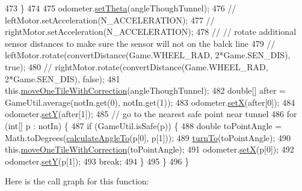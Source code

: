 \begin{DoxyCode}
473     \}
474 
475     odometer.\hyperlink{classca_1_1mcgill_1_1ecse211_1_1odometer_1_1_odometer_data_a419b8f07c2c5374411c8e62298e9a402}{setTheta}(angleThoughTunnel);
476     \textcolor{comment}{// leftMotor.setAcceleration(N\_ACCELERATION);}
477     \textcolor{comment}{// rightMotor.setAcceleration(N\_ACCELERATION);}
478     \textcolor{comment}{// // rotate additional sensor distances to make sure the sensor will not on the balck line}
479     \textcolor{comment}{// leftMotor.rotate(convertDistance(Game.WHEEL\_RAD, 2*Game.SEN\_DIS), true);}
480     \textcolor{comment}{// rightMotor.rotate(convertDistance(Game.WHEEL\_RAD, 2*Game.SEN\_DIS), false);}
481     this.\hyperlink{classca_1_1mcgill_1_1ecse211_1_1project_1_1_navigation_afbe677941e2bd44e35452e1eff508ae9}{moveOneTileWithCorrection}(angleThoughTunnel);
482     \textcolor{keywordtype}{double}[] after = GameUtil.average(notIn.get(0), notIn.get(1));
483     odometer.\hyperlink{classca_1_1mcgill_1_1ecse211_1_1odometer_1_1_odometer_data_a2911d7215e47f3064defe016b46bfeef}{setX}(after[0]);
484     odometer.\hyperlink{classca_1_1mcgill_1_1ecse211_1_1odometer_1_1_odometer_data_a82986438cd462e66520bc62bb4bd2b75}{setY}(after[1]);
485     \textcolor{comment}{// go to the nearest safe point near tunnel}
486     \textcolor{keywordflow}{for} (\textcolor{keywordtype}{int}[] p : notIn) \{
487       \textcolor{keywordflow}{if} (GameUtil.isSafe(p)) \{
488         \textcolor{keywordtype}{double} toPointAngle = Math.toDegrees(\hyperlink{classca_1_1mcgill_1_1ecse211_1_1project_1_1_navigation_a4376e54162df8f123ca3b52e4fd2f38d}{calculateAngleTo}(p[0], p[1]));
489         \hyperlink{classca_1_1mcgill_1_1ecse211_1_1project_1_1_navigation_a3bbe0645f2b3b3d0986b4a707fb5a00c}{turnTo}(toPointAngle);
490         this.\hyperlink{classca_1_1mcgill_1_1ecse211_1_1project_1_1_navigation_afbe677941e2bd44e35452e1eff508ae9}{moveOneTileWithCorrection}(toPointAngle);
491         odometer.\hyperlink{classca_1_1mcgill_1_1ecse211_1_1odometer_1_1_odometer_data_a2911d7215e47f3064defe016b46bfeef}{setX}(p[0]);
492         odometer.\hyperlink{classca_1_1mcgill_1_1ecse211_1_1odometer_1_1_odometer_data_a82986438cd462e66520bc62bb4bd2b75}{setY}(p[1]);
493         \textcolor{keywordflow}{break};
494       \}
495     \}
496   \}
\end{DoxyCode}
Here is the call graph for this function\+:
\nopagebreak
